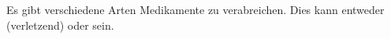 

\subsection{}
Es gibt verschiedene Arten Medikamente zu verabreichen. Dies
kann entweder  (verletzend) oder
 sein. 

